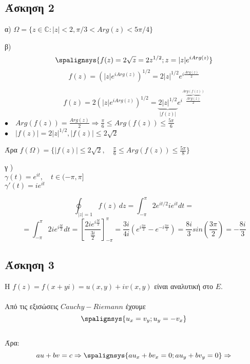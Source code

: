 \documentclass[12pt]{article}
\begin{document}
 \subsection{Άσκηση 2}
α) $
\Omega = \{z \in \mathbb{C}:|z|<2 , \pi/3  < Arg(z) <
 5\pi /4 \}
$
\\
\newline

β)
\[
\spalignsys{f(z)=2\sqrt{z}=2z^{1/2};z=|z|e^{iArg(z)}}
\]
$$
f(z)=(|z|e^{iArg(z)})^{1/2}=2|z|^{1/2}e^{i\frac{Arg(z)}{2}}
$$

\[
f(z)=2(|z|e^{iArg(z)})^{1/2}=
\underbrace{2|z|^{1/2}}_{\text{$|f(z)|$}}
e^{i
\overbrace{\frac{Arg(z)}{2}}^{\text{$Arg(f(z))$}}
}
\]
$\bullet \quad
Arg(f(z))=\frac{Arg(z)}{2}\Rightarrow \frac{\pi}{6}
\leqslant Arg(f(z)) \leqslant \frac{5\pi}{6}
$
\newline
$\bullet \quad
|f(z)|=2|z|^{1/2} ,|f(z)|\leqslant 2\sqrt{2}
$
\newline
\newline

Άρα $f(\Omega)=\{|f(z)|\leqslant2\sqrt{2} ,\quad \frac{\pi}{6}\leqslant Arg(f(z)) \leqslant \frac{5\pi}{8}\}$
\newpage

γ )
\\$ \gamma(t)=e^{it} ,\quad t\in(-\pi,\pi] $ \\ $\gamma'(t)=ie^{it} $ 

$$\oint_{|z|=1} f(z)  \,dz = \int_{-\pi}^{\pi} 2e^{it/2}ie^{it}dt= $$
$$
=\int_{-\pi}^{\pi} 2ie^{i\frac{3t}{2}} dt =
\left[ \frac{2ie^{i\frac{3t}{2}}}{\frac{3i}{2}}
\right]_{-\pi}^{\pi}=\frac{3i}{4i}(e^{i\frac{3\pi}{2}}-e^{-i\frac{3\pi}{2}})=\frac{8i}{3}sin\left(\frac{3\pi}{2}\right)=-\frac{8i}{3}
$$
\newline 
\newline 
 \subsection{Άσκηση 3}
Η $f(z)=f(x+yi)=u(x,y)+iv(x,y)$ είναι αναλυτική στο $Ε$. \\
\\
Από τις εξισώσεις $Cauchy-Riemann$ έχουμε
\\
\[
\spalignsys {u_x=v_y;u_y=-v_x}
\]
\\Άρα:
\[
au+bv=c 
\Rightarrow
\spalignsys{au_x+bv_x=0;au_y+bv_y=0}
\Rightarrow
\]
\end{document}

